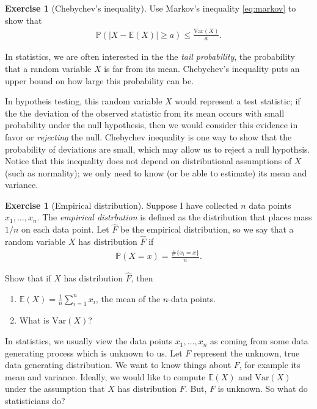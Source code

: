 \documentclass[11pt]{article}
\theoremstyle{definition}
\newtheorem{exercise}[]{Exercise}
\renewcommand{\P}{\mathbb{P}}
\newcommand{\E}{\mathbb{E}}
\newcommand{\V}{\text{Var}}
\begin{document}
\begin{exercise}[Chebychev's inequality]
  Use Markov's inequality \eqref{eq:markov} to show that
  \begin{align*}
    \P(|X - \E(X)| \geq a) \leq \frac{\V(X)}{a}.
  \end{align*}
\end{exercise}

In statistics, we are often interested in the the \textit{tail probability},
the probability that a random variable $X$ is far from its mean.
Chebychev's inequality puts an upper bound on how large this probability can be.

In hypotheis testing, this random variable $X$ would represent a test statistic;
if the the deviation of the observed statistic from its mean occurs with small probability under
the null hypothesis,
then we would consider this evidence in favor or \textit{rejecting} the null.
Chebychev inequality is one way to show that the probability of deviations are small,
which may allow us to reject a null hypothsis.
Notice that this inequality does not depend on distributional assumptions of $X$
(such as normality); we only need to know (or be able to estimate) its mean and variance.

\begin{exercise}[Empirical distribution]
Suppose I have collected $n$ data points $x_1, ..., x_n$. The \textit{empirical distrbution}
is defined as the distribution that places mass $1 / n$ on each data point.
Let $\hat F$ be the empirical distribution, so we say that a random variable $X$
has distribution $\hat F$ if
\begin{align*}
  \P(X = x) = \frac{\#\{x_i = x\}}{n}.
\end{align*}

Show that if $X$ has distribution $\hat F$, then
\begin{enumerate}[label = (\alph*)]
  \item $\E(X) = \frac{1}{n}\sum_{i=1}^n x_i$, the mean of the $n$-data points.
  \item What is $\V(X)$?
\end{enumerate}
\label{exer:empirical}
\end{exercise}

In statistics, we usually view the data points $x_1, ..., x_n$ as coming from some
data generating process which is unknown to us. Let $F$ represent the unknown, true
data generating distribution. We want to know things about $F$, for example its mean
and variance. Ideally, we would like to compute $\E(X)$ and $\V(X)$ under the assumption
that $X$ has distribution $F$. But, $F$ is unknown. So what do statisticians do?
\end{document}
